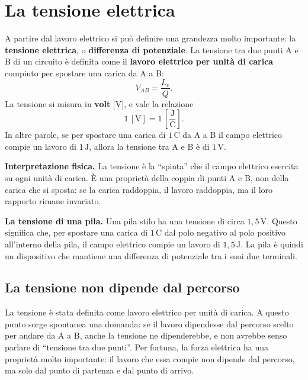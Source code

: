 \section{La tensione elettrica}

A partire dal lavoro elettrico si può definire una grandezza molto importante: la \textbf{tensione elettrica}, o \textbf{differenza di potenziale}. La tensione tra due punti A e B di un circuito è definita come il \textbf{lavoro elettrico per unità di carica} compiuto per spostare una carica da A a B:
\[
V_{AB} = \frac{L_e}{Q}.
\]
La tensione si misura in \textbf{volt} [\(\text{V}\)], e vale la relazione
\[
1\,[\text{V}] = 1\,\left[\frac{\text{J}}{\text{C}}\right].
\]
In altre parole, se per spostare una carica di \(1\,\text{C}\) da A a B il campo elettrico compie un lavoro di \(1\,\text{J}\), allora la tensione tra A e B è di \(1\,\text{V}\).

\begin{concetto}
\textbf{Interpretazione fisica.} La tensione è la ``spinta'' che il campo elettrico esercita su ogni unità di carica. È una proprietà della coppia di punti A e B, non della carica che si sposta: se la carica raddoppia, il lavoro raddoppia, ma il loro rapporto rimane invariato.
\end{concetto}

\begin{esempio}
\textbf{La tensione di una pila.} Una pila stilo ha una tensione di circa \(1{,}5\,\text{V}\). Questo significa che, per spostare una carica di \(1\,\text{C}\) dal polo negativo al polo positivo all'interno della pila, il campo elettrico compie un lavoro di \(1{,}5\,\text{J}\). La pila è quindi un dispositivo che mantiene una differenza di potenziale tra i suoi due terminali.
\end{esempio}

\subsection{La tensione non dipende dal percorso}

La tensione è stata definita come lavoro elettrico per unità di carica. A questo punto sorge spontanea una domanda: se il lavoro dipendesse dal percorso scelto per andare da A a B, anche la tensione ne dipenderebbe, e non avrebbe senso parlare di ``tensione tra due punti''. Per fortuna, la forza elettrica ha una proprietà molto importante: il lavoro che essa compie non dipende dal percorso, ma solo dal punto di partenza e dal punto di arrivo.

